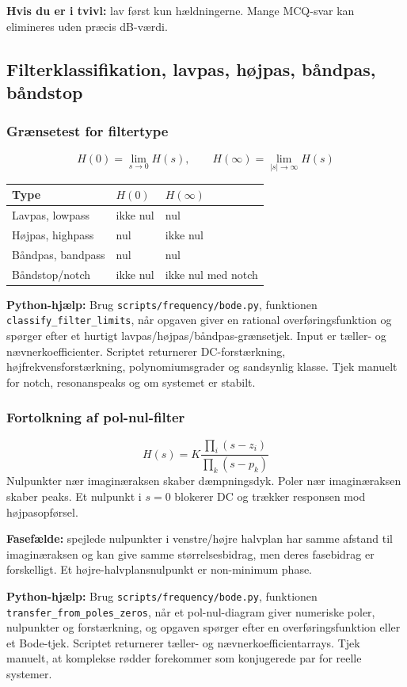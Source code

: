 \textbf{Hvis du er i tvivl:} lav først kun hældningerne. Mange MCQ-svar kan elimineres uden præcis dB-værdi.

\subsection{Filterklassifikation, lavpas, højpas, båndpas, båndstop}

\subsubsection{Grænsetest for filtertype}
\[
H(0)=\lim_{s\to0}H(s),\qquad
H(\infty)=\lim_{|s|\to\infty}H(s)
\]
\begin{tabular}{lll}
\toprule
Type & \(H(0)\) & \(H(\infty)\) \\
\midrule
Lavpas, lowpass & ikke nul & nul \\
Højpas, highpass & nul & ikke nul \\
Båndpas, bandpass & nul & nul \\
Båndstop/notch & ikke nul & ikke nul med notch \\
\bottomrule
\end{tabular}

\textbf{Python-hjælp:} Brug \texttt{scripts/frequency/bode.py}, funktionen \texttt{classify\_filter\_limits}, når opgaven giver en rational overføringsfunktion og spørger efter et hurtigt lavpas/højpas/båndpas-grænsetjek. Input er tæller- og nævnerkoefficienter. Scriptet returnerer DC-forstærkning, højfrekvensforstærkning, polynomiumsgrader og sandsynlig klasse. Tjek manuelt for notch, resonanspeaks og om systemet er stabilt.

\subsubsection{Fortolkning af pol-nul-filter}
\[
H(s)=K\frac{\prod_i(s-z_i)}{\prod_k(s-p_k)}
\]
Nulpunkter nær imaginæraksen skaber dæmpningsdyk. Poler nær imaginæraksen skaber peaks. Et nulpunkt i \(s=0\) blokerer DC og trækker responsen mod højpasopførsel.

\textbf{Fasefælde:} spejlede nulpunkter i venstre/højre halvplan har samme afstand til imaginæraksen og kan give samme størrelsesbidrag, men deres fasebidrag er forskelligt. Et højre-halvplansnulpunkt er non-minimum phase.

\textbf{Python-hjælp:} Brug \texttt{scripts/frequency/bode.py}, funktionen \texttt{transfer\_from\_poles\_zeros}, når et pol-nul-diagram giver numeriske poler, nulpunkter og forstærkning, og opgaven spørger efter en overføringsfunktion eller et Bode-tjek. Scriptet returnerer tæller- og nævnerkoefficientarrays. Tjek manuelt, at komplekse rødder forekommer som konjugerede par for reelle systemer.

